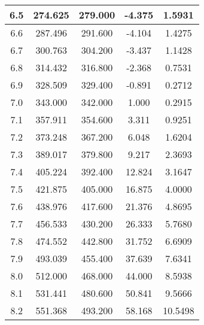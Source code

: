 \begin{table}[h!]
\begin{tabular}{|c|c|c|c|c|}
        6.5        & 274.625        & 279.000             & -4.375        & 1.5931                \\ \hline
        6.6        & 287.496        & 291.600             & -4.104        & 1.4275                \\ \hline
        6.7        & 300.763        & 304.200             & -3.437        & 1.1428                \\ \hline
        6.8        & 314.432        & 316.800             & -2.368        & 0.7531                \\ \hline
        6.9        & 328.509        & 329.400             & -0.891        & 0.2712                \\ \hline
        7.0        & 343.000        & 342.000             & 1.000         & 0.2915                \\ \hline
        7.1        & 357.911        & 354.600             & 3.311         & 0.9251                \\ \hline
        7.2        & 373.248        & 367.200             & 6.048         & 1.6204                \\ \hline
        7.3        & 389.017        & 379.800             & 9.217         & 2.3693                \\ \hline
        7.4        & 405.224        & 392.400             & 12.824        & 3.1647                \\ \hline
        7.5        & 421.875        & 405.000             & 16.875        & 4.0000                \\ \hline
        7.6        & 438.976        & 417.600             & 21.376        & 4.8695                \\ \hline
        7.7        & 456.533        & 430.200             & 26.333        & 5.7680                \\ \hline
        7.8        & 474.552        & 442.800             & 31.752        & 6.6909                \\ \hline
        7.9        & 493.039        & 455.400             & 37.639        & 7.6341                \\ \hline
        8.0        & 512.000        & 468.000             & 44.000        & 8.5938                \\ \hline
        8.1        & 531.441        & 480.600             & 50.841        & 9.5666                \\ \hline
        8.2        & 551.368        & 493.200             & 58.168        & 10.5498               \\ \hline

\end{tabular}
\end{table}
